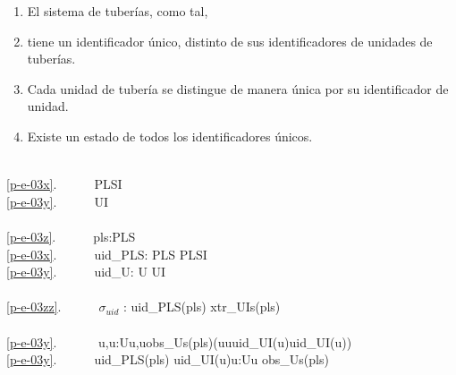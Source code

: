 \begin{enumerate}\setei
\item \label{p-e-03z} El sistema de tuberías, como tal,
\item \label{p-e-03x} tiene un identificador único, distinto de sus
                      identificadores de unidades de tuberías. 
\item \label{p-e-03y} Cada unidad de tubería se distingue de manera única por
                      su identificador de unidad. 
\item \label{p-e-03zz} Existe un estado de todos los identificadores únicos.
\savei\end{enumerate}
\mnewfoil
\bp
\>\ \\
\ref{p-e-03x}.\ \ \ \ \ \ PLSI \\
\ref{p-e-03y}.\ \ \ \ \ \ UI \\
\>\ \\
\ref{p-e-03z}.\ \ \ \ \ \ pls:PLS\\
\ref{p-e-03x}.\ \ \ \ \ \ uid\_PLS: PLS {\RIGHTARROW} PLSI\\
\ref{p-e-03y}.\ \ \ \ \ \ uid\_U: U {\RIGHTARROW} UI\\
\>\ \\
\ref{p-e-03zz}.\ \ \ \ \ \ $\sigma$$_{uid}$ :{\EQ} {\LBRACE} uid\_PLS(pls) {\RBRACE} {\UNION} xtr\_UIs(pls) \\
\>\  \\
\ref{p-e-03y}.\ \ \ \ \ \ {\ALL} u,u{\PRIM}:U{\RDOT}{\LBRACE}u,u{\PRIM}{\RBRACE}{\SUBSETEQ}obs\_Us(pls){\DBLRIGHTARROW}(u{\NOTEQ}u{\PRIM}{\DBLRIGHTARROW}uid\_UI(u){\NOTEQ}uid\_UI(u{\PRIM}))\\
\ref{p-e-03y}.\ \ \ \ {\WEDGE}\ \ uid\_PLS(pls) {\NOTISIN} {\LBRACE}uid\_UI(u){\BAR}u:U{\RDOT}u {\ISIN} obs\_Us(pls){\RBRACE}
\ep

